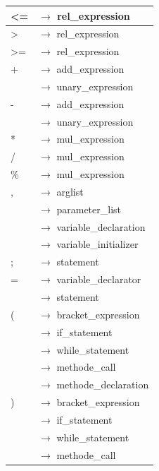 \documentclass[10pt,a4paper,titlepage]{article}
\begin{document}
\begin{ttfamily}
\begin{tabular}{| l  l |}
\hspace*{1.5cm}<= & $\to$ rel\_expression\\\hline
\hspace*{1.5cm}> & $\to$ rel\_expression\\\hline
\hspace*{1.5cm}>= & $\to$ rel\_expression\\\hline
\hspace*{1.5cm}+ & $\to$ add\_expression\\
 & $\to$ unary\_expression \\\hline
\hspace*{1.5cm}- & $\to$ add\_expression\\
 & $\to$ unary\_expression \\\hline
\hspace*{1.5cm}* & $\to$ mul\_expression\\\hline
\hspace*{1.5cm}/ & $\to$ mul\_expression\\\hline
\hspace*{1.5cm}\% & $\to$ mul\_expression\\\hline
\hspace*{1.5cm}, & $\to$ arglist \\
 & $\to$ parameter\_list \\
 & $\to$ variable\_declaration \\
 & $\to$ variable\_initializer\\\hline
\hspace*{1.5cm}; & $\to$ statement \\\hline
\hspace*{1.5cm}= & $\to$ variable\_declarator\\
 & $\to$ statement \\\hline
\hspace*{1.5cm}( & $\to$ bracket\_expression \\
 & $\to$ if\_statement \\
 & $\to$ while\_statement\\
 & $\to$ methode\_call \\
 & $\to$ methode\_declaration \hspace*{5cm}\\\hline
\hspace*{1.5cm}) & $\to$ bracket\_expression \\
 & $\to$ if\_statement \\
 & $\to$ while\_statement\\
 & $\to$ methode\_call \\

\end{tabular}
\end{ttfamily}
\end{document}
